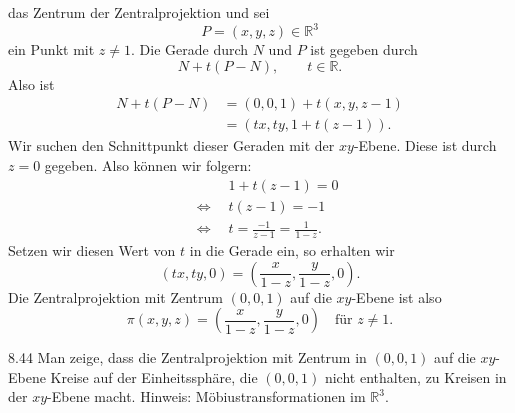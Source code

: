 das Zentrum der Zentralprojektion und sei
\[
P=(x,y,z)\in \mathbb R^3
\]
ein Punkt mit \(z\neq 1\).
Die Gerade durch \(N\) und \(P\) ist gegeben durch
\[
N+t(P-N),
\qquad t\in\mathbb R.
\]
Also ist 
\begin{align*}
    N+t(P-N)
    &=
    (0,0,1)+t(x,y,z-1)\\
    &=
    (tx,ty,1+t(z-1)).
\end{align*}
Wir suchen den Schnittpunkt dieser Geraden mit der \(xy\)-Ebene. Diese ist
durch $z=0$ gegeben. Also können wir folgern:
\begin{align*}
    &\phantom{\Leftrightarrow} \quad 1+t(z-1)=0\\
    &\Leftrightarrow \quad t(z-1)=-1\\
    &\Leftrightarrow \quad t=\frac{-1}{z-1} = \frac{1}{1-z}.
\end{align*}
Setzen wir diesen Wert von \(t\) in die Gerade ein, so erhalten wir
\[
(tx,ty,0)
=
\left(
\frac{x}{1-z},
\frac{y}{1-z},
0
\right).
\]
Die Zentralprojektion mit Zentrum \((0,0,1)\) auf die \(xy\)-Ebene ist also
\[
\boxed{
\pi(x,y,z)
=
\left(
\frac{x}{1-z},
\frac{y}{1-z},
0
\right)
\quad \text{für \(z\neq 1\).}
}
\]
\begin{exercise}{8.4}{4}
    Man zeige, dass die Zentralprojektion mit Zentrum in $(0, 0, 1)$ auf die
    $xy$-Ebene Kreise auf der Einheitssphäre, die $(0, 0, 1)$ nicht enthalten, zu Kreisen
    in der $xy$-Ebene macht. Hinweis: Möbiustransformationen im $\mathbb{R}^3$.
\end{exercise}
